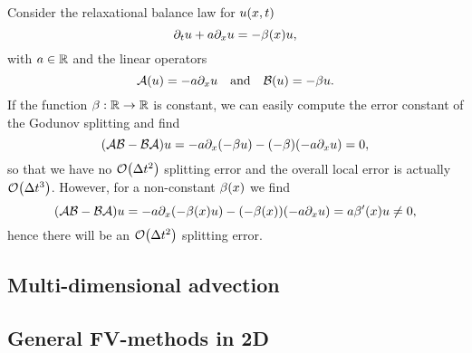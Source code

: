 \begin{example}
	Consider the relaxational balance law for \(u\parentheses*{x, t}\)
	\[
		\partial_t u + a\partial_x u = -\beta\parentheses*{x}u,
	\]
	with \(a \in \mathbb{R}\) and the linear operators
	\[
		\mathcal{A}\parentheses*{u} = -a\partial_x u \quad \text{and} \quad \mathcal{B}\parentheses*{u} = -\beta u.
	\]
	If the function \(\beta: \mathbb{R} \to \mathbb{R}\) is constant, we can easily compute the error constant of the Godunov splitting and find
	\[
		\parentheses*{\mathcal{A}\mathcal{B} - \mathcal{B}\mathcal{A}}u = -a\partial_x \parentheses*{-\beta u} - \parentheses*{-\beta}\parentheses*{-a\partial_x u} = 0,
	\]
	so that we have no \(\mathcal{O}\parentheses*{\Delta t^2}\) splitting error and the overall local error is actually \(\mathcal{O}\parentheses*{\Delta t^3}\).
	However, for a non-constant \(\beta\parentheses*{x}\) we find
	\[
		\parentheses*{\mathcal{A}\mathcal{B} - \mathcal{B}\mathcal{A}}u = -a\partial_x \parentheses*{-\beta\parentheses*{x} u} - \parentheses*{-\beta\parentheses*{x}}\parentheses*{-a\partial_x u} = a\beta'\parentheses*{x}u \ne 0,
	\]
	hence there will be an \(\mathcal{O}\parentheses*{\Delta t^2}\) splitting error.
\end{example}


\subsection{Multi-dimensional advection}


\subsection{General FV-methods in 2D}